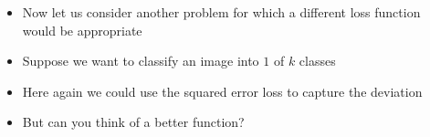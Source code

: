 \begin{frame}
  \begin{columns}
    \begin{overlayarea}{\textwidth}{\textheight}
      \vspace{0.3cm}
      \makebox[\textwidth][c]{\usebox{\nnfruitclassexamplecontent}}
    \end{overlayarea}

    \begin{overlayarea}{\textwidth}{\textheight}
      \begin{itemize}[<+->]
        \item Now let us consider another problem for which a different loss function would be appropriate
        \item Suppose we want to classify an image into $1$ of $k$ classes
        \item Here again we could use the squared error loss to capture the deviation
        \item But can you think of a better function?
      \end{itemize}
    \end{overlayarea}
  \end{columns}
\end{frame}

